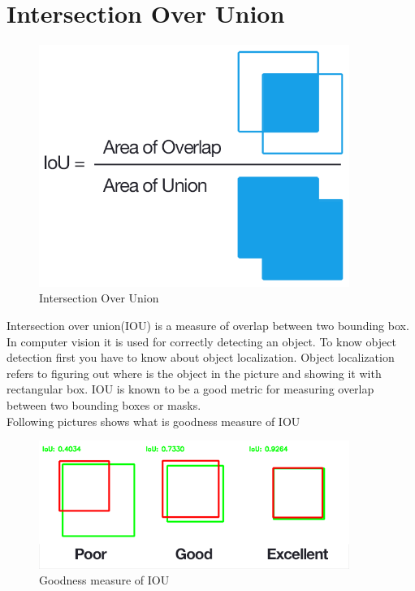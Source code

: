         \section{Intersection Over Union}
             \begin{figure}[ht]
                \centering
                \includegraphics[width=0.90\textwidth]{img/IOU_1.png}
                \caption{Intersection Over Union }
            \end{figure}
            Intersection over union(IOU) is a measure of overlap between two bounding box. In computer vision it is used for correctly detecting an object. To know object detection first you have to know about object localization. Object localization refers to figuring out where is the object in the picture and showing it with rectangular box. IOU is known to be a good metric for measuring overlap between two bounding boxes or masks. \\
            Following pictures shows what is goodness measure of IOU \\
            \begin{figure}[ht]
                \centering
                \includegraphics[width=0.90\textwidth]{img/IOU_3.png}
                \caption{Goodness measure of IOU}
            \end{figure}
